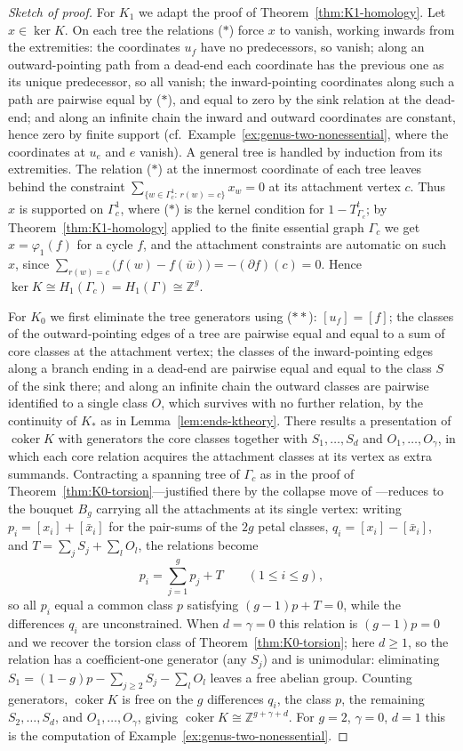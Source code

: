 \documentclass[12pt,reqno]{amsart}
\theoremstyle{plain}
\theoremstyle{definition}
\newcommand{\Z}{\mathbb{Z}}
\newcommand{\coker}{\operatorname{coker}}
\begin{document}
\begin{proof}[Sketch of proof]
For $K_1$ we adapt the proof of Theorem~\ref{thm:K1-homology}. Let $x\in\ker K$. On each tree the
relations ($*$) force $x$ to vanish, working inwards from the extremities: the coordinates $u_f$
have no predecessors, so vanish; along an outward-pointing path from a dead-end each coordinate has
the previous one as its unique predecessor, so all vanish; the inward-pointing coordinates along
such a path are pairwise equal by ($*$), and equal to zero by the sink relation at the dead-end;
and along an infinite chain the inward and outward coordinates are constant, hence zero by finite
support \textup(cf.\ Example~\ref{ex:genus-two-nonessential}, where the coordinates at $u_e$ and $e$
vanish\textup). A general tree is handled by induction from its extremities. The relation ($*$) at
the innermost coordinate of each tree leaves behind the constraint
$\sum_{\{w\in\Gamma_c^1:\,r(w)=c\}}x_w=0$ at its attachment vertex $c$. Thus $x$ is supported on
$\Gamma_c^1$, where ($*$) is the kernel condition for $1-T^{t}_{\Gamma_c}$; by
Theorem~\ref{thm:K1-homology} applied to the finite essential graph $\Gamma_c$ we get
$x=\varphi_1(f)$ for a cycle $f$, and the attachment constraints are automatic on such $x$, since
$\sum_{r(w)=c}\big(f(w)-f(\bar w)\big)=-(\partial f)(c)=0$. Hence
$\ker K\cong H_1(\Gamma_c)=H_1(\Gamma)\cong\Z^{g}$.

For $K_0$ we first eliminate the tree generators using ($**$): $[u_f]=[f]$; the classes of the
outward-pointing edges of a tree are pairwise equal and equal to a sum of core classes at the
attachment vertex; the classes of the inward-pointing edges along a branch ending in a dead-end are
pairwise equal and equal to the class $S$ of the sink there; and along an infinite chain the
outward classes are pairwise identified to a single class $O$, which survives with no further
relation, by the continuity of $K_*$ as in Lemma~\ref{lem:ends-ktheory}. There results a
presentation of $\coker K$ with generators the core classes together with $S_1,\dots,S_d$ and
$O_1,\dots,O_\gamma$, in which each core relation acquires the attachment classes at its vertex as
extra summands. Contracting a spanning tree of $\Gamma_c$ as in the proof of
Theorem~\ref{thm:K0-torsion}---justified there by the collapse move of
\cite[Theorem~5.2]{Sorensen}---reduces to the bouquet $B_g$ carrying all the attachments at its
single vertex: writing $p_i=[x_i]+[\bar x_i]$ for the pair-sums of the $2g$ petal classes,
$q_i=[x_i]-[\bar x_i]$, and $T=\sum_jS_j+\sum_lO_l$, the relations become
\[
p_i=\sum_{j=1}^{g}p_j+T\qquad(1\le i\le g),
\]
so all $p_i$ equal a common class $p$ satisfying $(g-1)p+T=0$, while the differences $q_i$ are
unconstrained. When $d=\gamma=0$ this relation is $(g-1)p=0$ and we recover the torsion class of
Theorem~\ref{thm:K0-torsion}; here $d\ge1$, so the relation has a coefficient-one generator
\textup(any $S_j$\textup) and is unimodular: eliminating $S_1=(1-g)p-\sum_{j\ge2}S_j-\sum_lO_l$
leaves a free abelian group. Counting generators, $\coker K$ is free on the $g$ differences
$q_i$, the class $p$, the remaining $S_2,\dots,S_d$, and $O_1,\dots,O_\gamma$, giving
$\coker K\cong\Z^{g+\gamma+d}$. For $g=2$, $\gamma=0$, $d=1$ this is the computation of
Example~\ref{ex:genus-two-nonessential}.


\end{proof}
\end{document}
